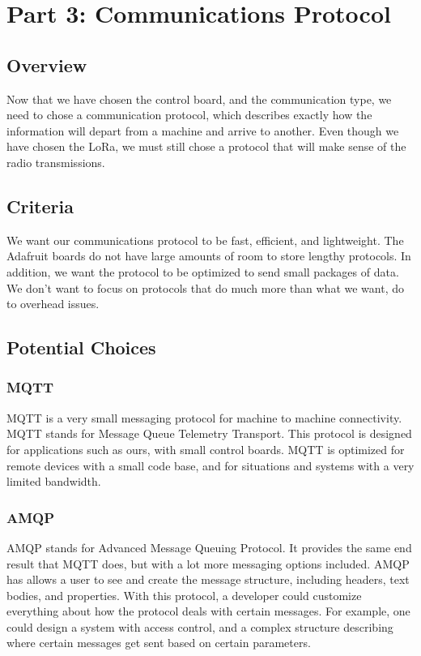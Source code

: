 \documentclass[onecolumn, draftclsnofoot,10pt, compsoc]{IEEEtran}
\begin{document}
    \section{Part 3: Communications Protocol}
	\subsection{Overview}
    Now that we have chosen the control board, and the communication type, we need to chose a communication protocol, which describes exactly how the information will depart from a machine and arrive to another.
    Even though we have chosen the LoRa, we must still chose a protocol that will make sense of the radio transmissions. 
    \subsection{Criteria}
    We want our communications protocol to be fast, efficient, and lightweight.
    The Adafruit boards do not have large amounts of room to store lengthy protocols.
    In addition, we want the protocol to be optimized to send small packages of data. 
   	We don't want to focus on protocols that do much more than what we want, do to overhead issues.
    
    \subsection{Potential Choices}
    
    \subsubsection{MQTT}
    MQTT is a very small messaging protocol for machine to machine connectivity.
    MQTT stands for Message Queue Telemetry Transport.
    This protocol is designed for applications such as ours, with small control boards. 
    MQTT is optimized for remote devices with a small code base, and for situations and systems with a very limited bandwidth. 
    
    \subsubsection{AMQP}
    AMQP stands for Advanced Message Queuing Protocol. 
    It provides the same end result that MQTT does, but with a lot more messaging options included. 
    AMQP has allows a user to see and create the message structure, including headers, text bodies, and properties.
    With this protocol, a developer could customize everything about how the protocol deals with certain messages. 
    For example, one could design a system with access control, and a complex structure describing where certain messages get sent based on certain parameters. 
    
\end{document}
